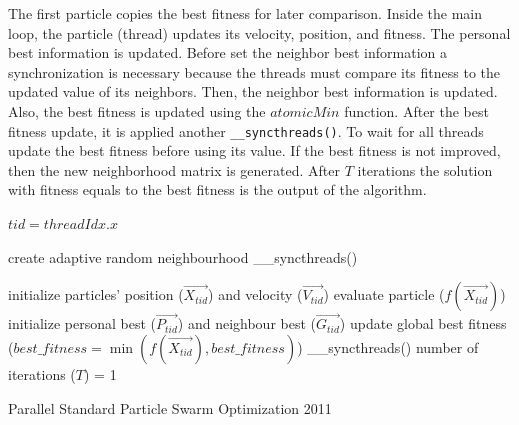 \documentclass{article}
\begin{document}
    The first particle copies the best fitness for later comparison.
    Inside the main loop, the particle (thread) updates its velocity, position, and fitness.
    The personal best information is updated.
    Before set the neighbor best information a synchronization is necessary because the threads must compare its fitness to the updated value of its neighbors.
    Then, the neighbor best information is updated. Also, the best fitness is updated using the $atomicMin$ function.
    After the best fitness update, it is applied another \texttt{\_\_syncthreads()}. To wait for all threads update the best fitness before using its value.
    If the best fitness is not improved, then the new neighborhood matrix is generated.
    After $T$ iterations the solution with fitness equals to the best fitness is the output of the algorithm.

    \begin{algorithm}[!htb]
        
        $tid = threadIdx.x\;$

        create adaptive random neighbourhood\;
        \_\_syncthreads()\;

        initialize particles' position ($\vec{X_{tid}}$) and velocity ($\vec{V_{tid}}$)\;
        evaluate particle ($f(\vec{X_{tid}})$)\;
        initialize personal best ($\vec{P_{tid}}$) and neighbour best ($\vec{G_{tid}}$)\;
        update global best fitness ($best\_fitness=\min(f(\vec{X_{tid}}), best\_fitness)$)\;
        \_\_syncthreads()\;
        number of iterations ($T$) = 1\;
        
        
        \caption{Parallel Standard Particle Swarm Optimization 2011}
        \label{alg:pspso2011}
    \end{algorithm}
\end{document}
